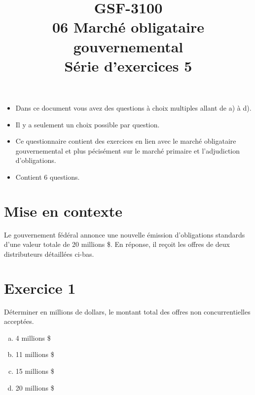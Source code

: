 \documentclass[10pt,a4paper]{article}
\title{GSF-3100 \\
06 Marché obligataire gouvernemental \\
Série d'exercices 5}
\begin{document}
\maketitle

\begin{itemize}
\item Dans ce document vous avez des questions à choix multiples allant de a) à d).  
\item Il y a seulement un choix possible par question.
\item Ce questionnaire contient des exercices en lien avec le marché obligataire gouvernemental et plus pécisément sur le marché primaire et l'adjudiction d'obligations.
\item Contient 6 questions. 
\end{itemize}
 
\newpage

\section*{Mise en contexte}

Le gouvernement fédéral annonce une nouvelle émission d’obligations standards d’une valeur totale de 20 millions \$.  En réponse, il reçoit les offres de deux distributeurs détaillées ci-bas.  

\begin{table}[H]
\centering
{}
\end{table}

\section*{Exercice 1}
Déterminer en millions de dollars,  le montant total des offres non concurrentielles acceptées.

\begin{enumerate}[a)]
\item 4 millions \$
\item 11 millions \$
\item 15 millions \$
\item 20 millions \$
\end{enumerate}
\end{document}
